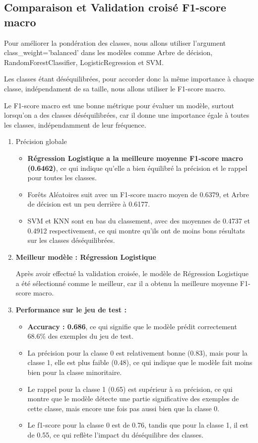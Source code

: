 \subsection{Comparaison et Validation croisé F1-score macro}
\begin{flushleft}
Pour améliorer la pondération des classes, nous allons utiliser l'argument class\_weight='balanced' dans les modèles comme Arbre de décision, RandomForestClassifier, LogisticRegression et SVM. 

Les classes étant déséquilibrées, pour accorder donc la même importance à chaque classe, indépendament de sa taille, nous allons utiliser le F1-score macro. 

Le F1-score macro est une bonne métrique pour évaluer un modèle, surtout lorsqu'on a des classes déséquilibrées, car il donne une importance égale à toutes les classes, indépendamment de leur fréquence.
\end{flushleft}
\begin{enumerate}
\item Précision globale
\begin{itemize}
\item \textbf{Régression Logistique a la meilleure moyenne F1-score macro (0.6462)}, ce qui indique qu'elle a bien équilibré la précision et le rappel pour toutes les classes.
\item Forêts Aléatoires suit avec un F1-score macro moyen de 0.6379, et Arbre de décision est un peu derrière à 0.6177.
\item SVM et KNN sont en bas du classement, avec des moyennes de 0.4737 et 0.4912 respectivement, ce qui montre qu'ils ont de moins bons résultats sur les classes déséquilibrées.
\end{itemize}

\item \textbf{Meilleur modèle : Régression Logistique}

Après avoir effectué la validation croisée, le modèle de Régression Logistique a été sélectionné comme le meilleur, car il a obtenu la meilleure moyenne F1-score macro.

\item \textbf{Performance sur le jeu de test :}
\begin{itemize}
\item \textbf{Accuracy : 0.686}, ce qui signifie que le modèle prédit correctement 68.6\% des exemples du jeu de test.
\item La précision pour la classe 0 est relativement bonne (0.83), mais pour la classe 1, elle est plus faible (0.48), ce qui indique que le modèle fait moins bien pour la classe minoritaire.
\item Le rappel pour la classe 1 (0.65) est supérieur à sa précision, ce qui montre que le modèle détecte une partie significative des exemples de cette classe, mais encore une fois pas aussi bien que la classe 0.
\item Le f1-score pour la classe 0 est de 0.76, tandis que pour la classe 1, il est de 0.55, ce qui reflète l'impact du déséquilibre des classes.
\end{itemize}
\end{enumerate}

